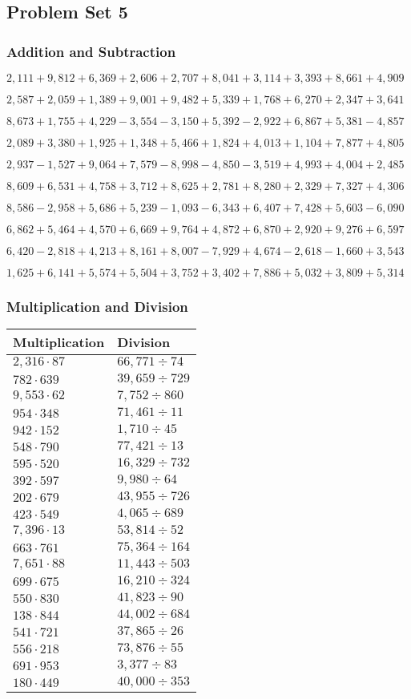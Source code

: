 \hypertarget{problem-set-5-3}{%
\subsection{Problem Set 5}\label{problem-set-5-3}}

\hypertarget{addition-and-subtraction-167}{%
\subsubsection{Addition and
Subtraction}\label{addition-and-subtraction-167}}

\(2,111+9,812+6,369+2,606+2,707+8,041+3,114+3,393+8,661+ 4,909\)

\(2,587+2,059+1,389+9,001+9,482+5,339+1,768+6,270+2,347+3,641\)

\(8,673+1,755+4,229-3,554-3,150+5,392-2,922+6,867+5,381-4,857\)

\(2,089+3,380+1,925+1,348+5,466+1,824+4,013+1,104+7,877+4,805\)

\(2,937-1,527+9,064+7,579-8,998-4,850-3,519+4,993+4,004+2,485\)

\(8,609+6,531+4,758+3,712+8,625+2,781+8,280+2,329+7,327+4,306\)

\(8,586-2,958+5,686+5,239-1,093-6,343+6,407+7,428+5,603-6,090\)

\(6,862+5,464+4,570+6,669+9,764+4,872+6,870+2,920+9,276+6,597\)

\(6,420-2,818+4,213+8,161+8,007-7,929+4,674-2,618-1,660+3,543\)

\(1,625+6,141+5,574+5,504+3,752+3,402+7,886+5,032+3,809+5,314\)

\hypertarget{multiplication-and-division-166}{%
\subsubsection{Multiplication and
Division}\label{multiplication-and-division-166}}

\begin{longtable}[]{@{}ll@{}}
\toprule
Multiplication & Division\tabularnewline
\midrule
\endhead
\(2,316\cdot87\) & \(66,771÷74\)\tabularnewline
\(782\cdot639\) & \(39,659÷729\)\tabularnewline
\(9,553\cdot62\) & \(7,752÷860\)\tabularnewline
\(954\cdot348\) & \(71,461÷11\)\tabularnewline
\(942\cdot152\) & \(1,710÷45\)\tabularnewline
\(548\cdot790\) & \(77,421÷13\)\tabularnewline
\(595\cdot520\) & \(16,329÷732\)\tabularnewline
\(392\cdot597\) & \(9,980÷64\)\tabularnewline
\(202\cdot679\) & \(43,955÷726\)\tabularnewline
\(423\cdot549\) & \(4,065÷689\)\tabularnewline
\(7,396\cdot13\) & \(53,814÷52\)\tabularnewline
\(663\cdot761\) & \(75,364÷164\)\tabularnewline
\(7,651\cdot88\) & \(11,443÷503\)\tabularnewline
\(699\cdot675\) & \(16,210÷324\)\tabularnewline
\(550\cdot830\) & \(41,823÷90\)\tabularnewline
\(138\cdot844\) & \(44,002÷684\)\tabularnewline
\(541\cdot721\) & \(37,865÷26\)\tabularnewline
\(556\cdot218\) & \(73,876÷55\)\tabularnewline
\(691\cdot953\) & \(3,377÷83\)\tabularnewline
\(180\cdot449\) & \(40,000÷353\)\tabularnewline
\bottomrule
\end{longtable}

